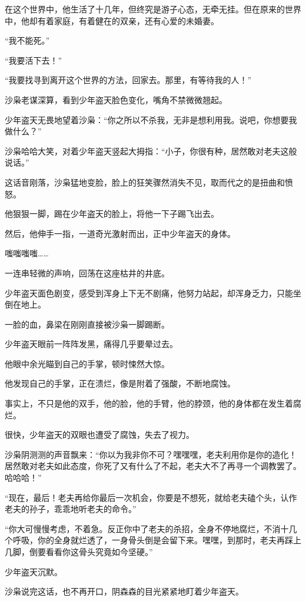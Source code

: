 \begin{this_body}
在这个世界中，他生活了十几年，但终究是游子心态，无牵无挂。但在原来的世界中，他却有着家庭，有着健在的双亲，还有心爱的未婚妻。

“我不能死。”

“我要活下去！”

“我要找寻到离开这个世界的方法，回家去。那里，有等待我的人！”

沙枭老谋深算，看到少年盗天脸色变化，嘴角不禁微微翘起。

少年盗天无畏地望着沙枭：“你之所以不杀我，无非是想利用我。说吧，你想要我做什么？”

沙枭哈哈大笑，对着少年盗天竖起大拇指：“小子，你很有种，居然敢对老夫这般说话。”

这话音刚落，沙枭猛地变脸，脸上的狂笑骤然消失不见，取而代之的是扭曲和愤怒。

他狠狠一脚，踢在少年盗天的脸上，将他一下子踢飞出去。

然后，他伸手一指，一道奇光激射而出，正中少年盗天的身体。

嗤嗤嗤嗤……

一连串轻微的声响，回荡在这座枯井的井底。

少年盗天面色剧变，感受到浑身上下无不剧痛，他努力站起，却浑身乏力，只能坐倒在地上。

一脸的血，鼻梁在刚刚直接被沙枭一脚踢断。

少年盗天眼前一阵阵发黑，痛得几乎要晕过去。

他眼中余光瞄到自己的手掌，顿时悚然大惊。

他发现自己的手掌，正在溃烂，像是附着了强酸，不断地腐蚀。

事实上，不只是他的双手，他的脸，他的手臂，他的脖颈，他的身体都在发生着腐烂。

很快，少年盗天的双眼也遭受了腐蚀，失去了视力。

沙枭阴测测的声音飘来：“你以为我非你不可？嘿嘿嘿，老夫利用你是你的造化！居然敢对老夫如此态度，你死了又有什么了不起，老夫大不了再寻一个调教罢了。哈哈哈！”

“现在，最后！老夫再给你最后一次机会，你要是不想死，就给老夫磕个头，认作老夫的孙子，乖乖地听老夫的命令。”

“你大可慢慢考虑，不着急。反正你中了老夫的杀招，全身不停地腐烂，不消十几个呼吸，你的全身就烂透了，一身骨头倒是会留下来。嘿嘿，到那时，老夫再踩上几脚，倒要看看你这骨头究竟如今坚硬。”

少年盗天沉默。

沙枭说完这话，也不再开口，阴森森的目光紧紧地盯着少年盗天。


\end{this_body}
